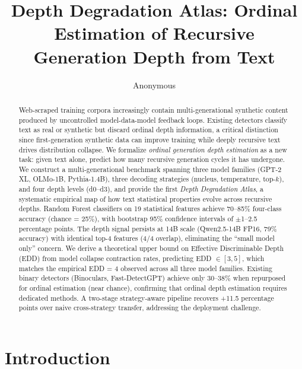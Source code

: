 \documentclass[11pt,a4paper]{article}
\title{Depth Degradation Atlas: Ordinal Estimation of Recursive Generation Depth from Text}
\author{Anonymous}
\date{}
\newcommand{\edd}{\textsc{EDD}}
\begin{document}
\maketitle

\begin{abstract}
Web-scraped training corpora increasingly contain multi-generational synthetic content produced by uncontrolled model-data-model feedback loops. Existing detectors classify text as real or synthetic but discard ordinal depth information, a critical distinction since first-generation synthetic data can improve training while deeply recursive text drives distribution collapse. We formalize \emph{ordinal generation depth estimation} as a new task: given text alone, predict how many recursive generation cycles it has undergone. We construct a multi-generational benchmark spanning three model families (GPT-2 XL, OLMo-1B, Pythia-1.4B), three decoding strategies (nucleus, temperature, top-$k$), and four depth levels (d0--d3), and provide the first \emph{Depth Degradation Atlas}, a systematic empirical map of how text statistical properties evolve across recursive depths. Random Forest classifiers on 19 statistical features achieve 70--85\% four-class accuracy (chance = 25\%), with bootstrap 95\% confidence intervals of $\pm$1--2.5 percentage points. The depth signal persists at 14B scale (Qwen2.5-14B FP16, 79\% accuracy) with identical top-4 features (4/4 overlap), eliminating the ``small model only'' concern. We derive a theoretical upper bound on Effective Discriminable Depth (\edd) from model collapse contraction rates, predicting \edd{} $\in [3,5]$, which matches the empirical \edd{} = 4 observed across all three model families. Existing binary detectors (Binoculars, Fast-DetectGPT) achieve only 30--38\% when repurposed for ordinal estimation (near chance), confirming that ordinal depth estimation requires dedicated methods. A two-stage strategy-aware pipeline recovers +11.5 percentage points over naive cross-strategy transfer, addressing the deployment challenge.
\end{abstract}

\section{Introduction}
\end{document}
